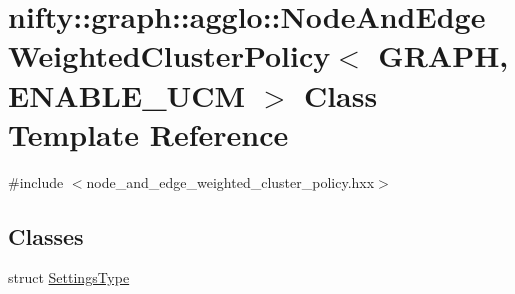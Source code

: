 \hypertarget{classnifty_1_1graph_1_1agglo_1_1NodeAndEdgeWeightedClusterPolicy}{}\section{nifty\+:\+:graph\+:\+:agglo\+:\+:Node\+And\+Edge\+Weighted\+Cluster\+Policy$<$ G\+R\+A\+P\+H, E\+N\+A\+B\+L\+E\+\_\+\+U\+C\+M $>$ Class Template Reference}
\label{classnifty_1_1graph_1_1agglo_1_1NodeAndEdgeWeightedClusterPolicy}


{\ttfamily \#include $<$node\+\_\+and\+\_\+edge\+\_\+weighted\+\_\+cluster\+\_\+policy.\+hxx$>$}

\subsection*{Classes}
\begin{DoxyCompactItemize}
\item 
struct \hyperlink{structnifty_1_1graph_1_1agglo_1_1NodeAndEdgeWeightedClusterPolicy_1_1SettingsType}{Settings\+Type}
\end{DoxyCompactItemize}
